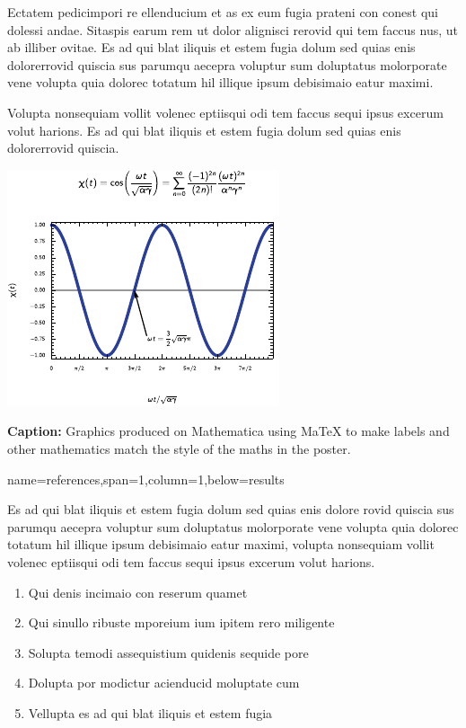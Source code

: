 \documentclass[a0paper,portrait]{baposter}
\begin{document}
\begin{poster}
{\begin{multicols}{2}
Ectatem pedicimpori re ellenducium et as ex eum fugia prateni con conest qui dolessi andae. Sitaspis earum rem ut dolor alignisci rerovid qui tem faccus nus, ut ab illiber ovitae. Es ad qui blat iliquis et estem fugia dolum sed quias enis dolorerrovid quiscia sus parumqu aecepra voluptur sum doluptatus molorporate vene volupta quia dolorec totatum hil illique ipsum debisimaio eatur maximi. 

\vfill\null
\columnbreak

Volupta nonsequiam vollit volenec eptiisqui odi tem faccus sequi ipsus excerum volut harions. Es ad qui blat iliquis et estem fugia dolum sed quias enis dolorerrovid quiscia.


\begin{center}
\includegraphics[scale=1,valign=T]{sample-figure.pdf}
\end{center}

\footnotesize \smaller
\textbf{Caption:} Graphics produced on Mathematica using MaTeX to make labels and other mathematics match the style of the maths in the poster.
\vfill\null
\end{multicols}

}

{name=references,span=1,column=1,below=results}{
Es ad qui blat iliquis et estem fugia dolum sed quias enis dolore rovid quiscia sus parumqu aecepra voluptur sum doluptatus molorporate vene volupta quia dolorec totatum hil illique ipsum debisimaio eatur maximi, volupta nonsequiam vollit volenec eptiisqui odi tem faccus sequi ipsus excerum volut harions.

\begin{enumerate}
\item Qui denis incimaio con reserum quamet
\item Qui sinullo ribuste mporeium ium ipitem rero miligente
\item Solupta temodi assequistium quidenis sequide pore
\item Dolupta por modictur acienducid moluptate cum
\item Vellupta es ad qui blat iliquis et estem fugia
\end{enumerate}
\vspace{1mm}
}







\end{poster}
\end{document}
